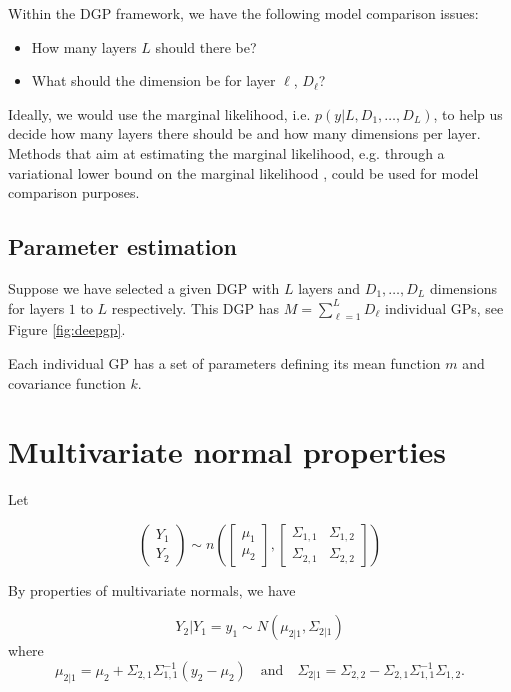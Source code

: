 \documentclass{article}
\newcommand{\1}{\mathbbm{1}}
\begin{document}
Within the DGP framework,
we have the following model comparison issues:

\begin{itemize}
\item How many layers $L$ should there be?
\item What should the dimension be for layer $\ell$, $D_\ell$?
\end{itemize}
Ideally, we would use the marginal likelihood, 
i.e. $p(y|L,D_1,\ldots,D_L)$, to help us decide how many layers there should be
and how many dimensions per layer.
Methods that aim at estimating the marginal likelihood,
e.g. through a variational lower bound on the marginal likelihood \citep{damianou2013deep},
could be used for model comparison purposes.

\subsection{Parameter estimation}

Suppose we have selected a given DGP with $L$ layers and $D_1,\ldots,D_L$ 
dimensions for layers $1$ to $L$ respectively.
This DGP has $M=\sum_{\ell=1}^L D_\ell$ individual GPs, 
see Figure \ref{fig:deepgp}.

Each individual GP has a set of parameters defining its mean function $m$ and 
covariance function $k$. 


\appendix
\section{Multivariate normal properties}
\label{app:normal}

Let

\[
\left( \begin{array}{c} Y_1 \\ Y_2 \end{array} \right) \sim 
n\left(\left[\begin{array}{c} \mu_1 \\ \mu_2 \end{array} \right] , 
\left[\begin{array}{cc} \Sigma_{1,1} & \Sigma_{1,2} \\ 
\Sigma_{2,1} & \Sigma_{2,2} \end{array} \right]\right)
\]

By properties of multivariate normals, we have 

\[
Y_2|Y_1=y_1 \sim N\left(\mu_{2|1}, \Sigma_{2|1}\right)
\]
where
\[
\mu_{2|1} = \mu_2 + \Sigma_{2,1}\Sigma_{1,1}^{-1}(y_2-\mu_2)
\quad \mbox{and} \quad
\Sigma_{2|1} = \Sigma_{2,2} - \Sigma_{2,1}\Sigma_{1,1}^{-1}\Sigma_{1,2}.
\]
\end{document}
